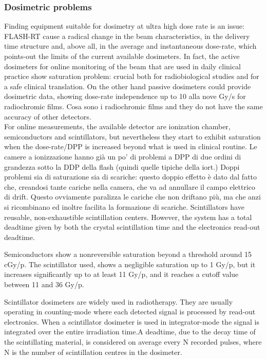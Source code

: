     \subsubsection{Dosimetric problems}
        Finding equipment suitable for dosimetry at ultra high dose rate is an issue: FLASH-RT cause a radical change in the beam characteristics, in the delivery time structure and, above all, in the average and     instantaneous dose-rate, which points-out the limits of the current available dosimeters.
        In fact, the active dosimeters for online monitoring of the beam that are used in daily clinical practice show saturation problem: crucial both for radiobiological studies and for a safe clinical translation.
        On the other hand passive dosimeters could provide dosimetric data, showing dose-rate independence up to 10 alla nove Gy/s for radiochromic films.
        Cosa sono i radiochromic films and they do not have the same accuracy of other detectors.\\
        For online measurements, the available detector are ionization chamber, semiconductors and scintillators, but nevertheless they start to exhibit saturation when the dose-rate/DPP is increased beyond what is used in clinical routine.
        Le camere a ionizzazione hanno già un po' di problemi a DPP di due ordini di grandezza sotto la DDP della flash (quindi quelle tipiche della iort.)
        Doppi problemi sia di saturazione sia di scariche: 
        questo doppio effetto è dato dal fatto che, creandosi tante cariche nella camera, che va ad annullare il campo elettrico di drift. Questo ovviamente paralizza le cariche che non driftano più, ma che anzi si ricombinano ed inoltre facilita la formazione di scariche.
        Scintillators have reusable, non-exhaustible scintillation centers. However, the system has a total deadtime given by both the crystal scintillation time and the electronics read-out deadtime.

        Semiconductors show a nonreversible saturation beyond a threshold around 15 cGy/p. The scintillator used, shows a negligible saturation up to 1 Gy/p, but it increases significantly up to at least 11 Gy/p, and it reaches a cutoff value between 11 and 36 Gy/p.

        Scintillator dosimeters are widely used in radiotherapy. They are usually operating in counting-mode where each detected signal is processed by read-out electronics. When a scintillator dosimeter is used in integrator-mode the signal is integrated over the entire irradiation time.A deadtime, due to the decay time of the scintillating material, is considered on average every N recorded pulses, where N is the number of scintillation centres in the dosimeter.


